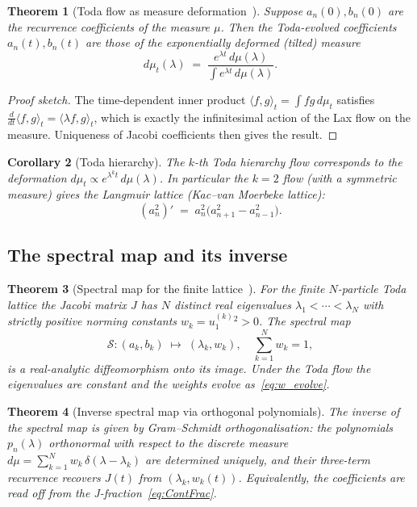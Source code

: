 \documentclass[12pt,a4paper]{article}
\newtheorem{theorem}{Theorem}[section]
\newtheorem{corollary}[theorem]{Corollary}
\theoremstyle{definition}
\begin{document}
\begin{theorem}[Toda flow as measure deformation~\cite{Flaschka1974,Zhedanov2022}]
\label{thm:expmeasure}
Suppose $a_n(0),b_n(0)$ are the recurrence coefficients of the measure
$\mu$.  Then the Toda-evolved coefficients $a_n(t),b_n(t)$ are those of
the \emph{exponentially deformed (tilted) measure}
\begin{equation}\label{eq:expdmu}
  d\mu_t(\lambda) \;=\; \frac{e^{\lambda t}\,d\mu(\lambda)}
                              {\displaystyle\int e^{\lambda t}\,d\mu(\lambda)}.
\end{equation}
\end{theorem}

\begin{proof}[Proof sketch]
The time-dependent inner product $\langle f,g\rangle_t = \int fg\,d\mu_t$
satisfies $\tfrac{d}{dt}\langle f,g\rangle_t = \langle \lambda f,g\rangle_t$,
which is exactly the infinitesimal action of the Lax flow on the measure.
Uniqueness of Jacobi coefficients then gives the result.
\end{proof}

\begin{corollary}[Toda hierarchy]
The $k$-th Toda hierarchy flow corresponds to the deformation
$d\mu_t \propto e^{\lambda^k t}\,d\mu(\lambda)$.  In particular the $k=2$
flow (with a symmetric measure) gives the \emph{Langmuir lattice}
(Kac--van Moerbeke lattice):
\[
  (a_n^2)' \;=\; a_n^2\bigl(a_{n+1}^2 - a_{n-1}^2\bigr).
\]
\end{corollary}

\subsection{The spectral map and its inverse}

\begin{theorem}[Spectral map for the finite lattice~\cite{Teschl2000}]
For the finite $N$-particle Toda lattice the Jacobi matrix $J$ has $N$
distinct real eigenvalues $\lambda_1 < \cdots < \lambda_N$ with strictly
positive norming constants $w_k = u_{1}^{(k)}{}^2 > 0$.  The \emph{spectral map}
\[
  \mathcal{S}\colon (a_k,b_k) \;\longmapsto\; (\lambda_k, w_k),
  \quad \sum_{k=1}^N w_k = 1,
\]
is a real-analytic diffeomorphism onto its image.
Under the Toda flow the eigenvalues are constant and the weights evolve
as~\eqref{eq:w_evolve}.
\end{theorem}

\begin{theorem}[Inverse spectral map via orthogonal polynomials]
The inverse of the spectral map is given by Gram--Schmidt
orthogonalisation: the polynomials $p_n(\lambda)$ orthonormal with respect
to the discrete measure $d\mu = \sum_{k=1}^N w_k\,\delta(\lambda-\lambda_k)$
are determined uniquely, and their three-term recurrence
recovers $J(t)$ from $(\lambda_k, w_k(t))$.  Equivalently, the
coefficients are read off from the J-fraction~\eqref{eq:ContFrac}.
\end{theorem}
\end{document}
